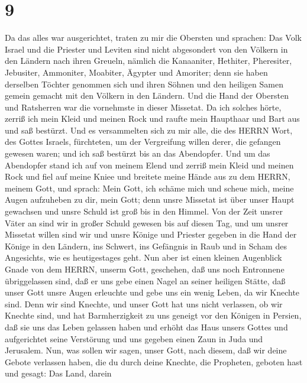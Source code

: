\hypertarget{section-8}{%
\section{9}\label{section-8}}

 Da das alles war ausgerichtet, traten zu mir die Obersten
und sprachen: Das Volk Israel und die Priester und Leviten sind nicht
abgesondert von den Völkern in den Ländern nach ihren Greueln, nämlich
die Kanaaniter, Hethiter, Pheresiter, Jebusiter, Ammoniter, Moabiter,
Ägypter und Amoriter;  denn sie haben derselben Töchter
genommen sich und ihren Söhnen und den heiligen Samen gemein gemacht mit
den Völkern in den Ländern. Und die Hand der Obersten und Ratsherren war
die vornehmste in dieser Missetat.  Da ich solches hörte,
zerriß ich mein Kleid und meinen Rock und raufte mein Haupthaar und Bart
aus und saß bestürzt.  Und es versammelten sich zu mir alle,
die des HERRN Wort, des Gottes Israels, fürchteten, um der Vergreifung
willen derer, die gefangen gewesen waren; und ich saß bestürzt bis an
das Abendopfer.  Und um das Abendopfer stand ich auf von
meinem Elend und zerriß mein Kleid und meinen Rock und fiel auf meine
Kniee und breitete meine Hände aus zu dem HERRN, meinem Gott,
 und sprach: Mein Gott, ich schäme mich und scheue mich,
meine Augen aufzuheben zu dir, mein Gott; denn unsre Missetat ist über
unser Haupt gewachsen und unsre Schuld ist groß bis in den Himmel.
 Von der Zeit unsrer Väter an sind wir in großer Schuld
gewesen bis auf diesen Tag, und um unsrer Missetat willen sind wir und
unsre Könige und Priester gegeben in die Hand der Könige in den Ländern,
ins Schwert, ins Gefängnis in Raub und in Scham des Angesichts, wie es
heutigestages geht.  Nun aber ist einen kleinen Augenblick
Gnade von dem HERRN, unserm Gott, geschehen, daß uns noch Entronnene
übriggelassen sind, daß er uns gebe einen Nagel an seiner heiligen
Stätte, daß unser Gott unsre Augen erleuchte und gebe uns ein wenig
Leben, da wir Knechte sind.  Denn wir sind Knechte, und
unser Gott hat uns nicht verlassen, ob wir Knechte sind, und hat
Barmherzigkeit zu uns geneigt vor den Königen in Persien, daß sie uns
das Leben gelassen haben und erhöht das Haus unsers Gottes und
aufgerichtet seine Verstörung und uns gegeben einen Zaun in Juda und
Jerusalem.  Nun, was sollen wir sagen, unser Gott, nach
diesem, daß wir deine Gebote verlassen haben,  die du durch
deine Knechte, die Propheten, geboten hast und gesagt: Das Land, darein
